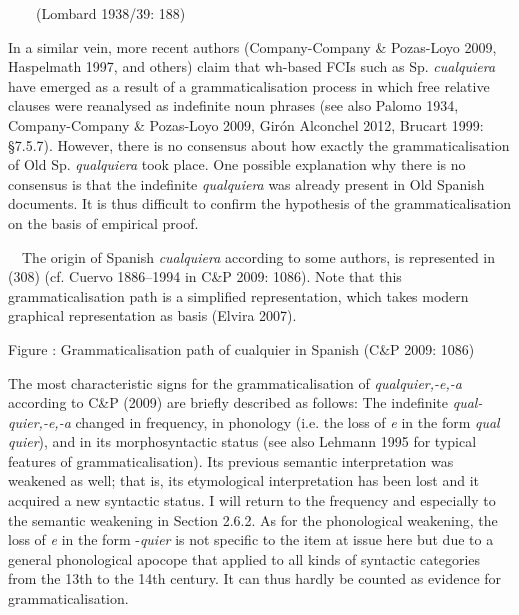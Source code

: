 \begin{styleStandard}
\ \ \ \ (Lombard 1938/39: 188)
\end{styleStandard}

\begin{styleStandard}
In a similar vein, more recent authors (Company-Company \& Pozas-Loyo 2009, Haspelmath 1997, and others) claim that wh-based FCIs such as Sp. \textit{cualquiera} have emerged as a result of a grammaticalisation process in which free relative clauses were reanalysed as indefinite noun phrases (see also Palomo 1934, Company-Company \& Pozas-Loyo 2009, Girón Alconchel 2012, Brucart 1999: §7.5.7). However, there is no consensus about how exactly the grammaticalisation of Old Sp. \textit{qualquiera} took place. One possible explanation why there is no consensus is that the indefinite \textit{qualquiera} was already present in Old Spanish documents. It is thus difficult to confirm the hypothesis of the grammaticalisation on the basis of empirical proof. 
\end{styleStandard}

\begin{styleStandard}
\ \ The origin of Spanish \textit{cualquiera} according to some authors, is represented in (308) (cf. Cuervo 1886–1994 in C\&P 2009: 1086). Note that this grammaticalisation path is a simplified representation, which takes modern graphical representation as basis (Elvira 2007). 
\end{styleStandard}

\begin{styletablecaption}
Figure : Grammaticalisation path of cualquier in Spanish (C\&P 2009: 1086)
\end{styletablecaption}

\begin{styleStandard}
The most characteristic signs for the grammaticalisation of \textit{qualquier,-e,-a} according to C\&P (2009) are briefly described as follows: The indefinite \textit{qual-quier,\nobreakdash-e,\nobreakdash-a} changed in frequency, in phonology (i.e. the loss of \textit{e} in the form \textit{qual quier}), and in its morphosyntactic status (see also Lehmann 1995 for typical features of grammaticalisation). Its previous semantic interpretation was weakened as well; that is, its etymological interpretation has been lost and it acquired a new syntactic status. I will return to the frequency and especially to the semantic weakening in Section 2.6.2. As for the phonological weakening, the loss of \textit{e} in the form -\textit{quier} is not specific to the item at issue here but due to a general phonological apocope that applied to all kinds of syntactic categories from the 13th to the 14th century. It can thus hardly be counted as evidence for grammaticalisation.
\end{styleStandard}

